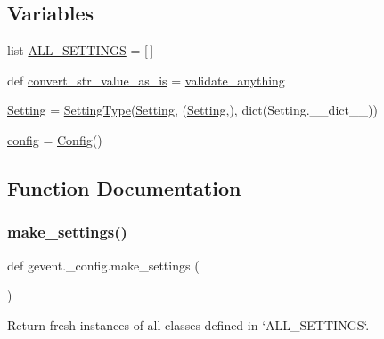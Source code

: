 \subsection*{Variables}
\begin{DoxyCompactItemize}
\item 
list \hyperlink{namespacegevent_1_1__config_a2234af414a8e29e19e450934eb35c6d0}{A\+L\+L\+\_\+\+S\+E\+T\+T\+I\+N\+GS} = \mbox{[}$\,$\mbox{]}
\item 
def \hyperlink{namespacegevent_1_1__config_a6a13721038d351f2beb717d878a45083}{convert\+\_\+str\+\_\+value\+\_\+as\+\_\+is} = \hyperlink{namespacegevent_1_1__config_a6588800a66294e87809274c9ed90bb21}{validate\+\_\+anything}
\item 
\hyperlink{namespacegevent_1_1__config_a8e4912eac38e2ae242f267b4111390fc}{Setting} = \hyperlink{classgevent_1_1__config_1_1_setting_type}{Setting\+Type}(\textquotesingle{}\hyperlink{classgevent_1_1__config_1_1_setting}{Setting}\textquotesingle{}, (\hyperlink{classgevent_1_1__config_1_1_setting}{Setting},), dict(Setting.\+\_\+\+\_\+dict\+\_\+\+\_\+))
\item 
\hyperlink{namespacegevent_1_1__config_a8c4472a27c205b88b76f8e4314a207c8}{config} = \hyperlink{classgevent_1_1__config_1_1_config}{Config}()
\end{DoxyCompactItemize}


\subsection{Function Documentation}
\mbox{\label{namespacegevent_1_1__config_a11c303bdbf900089c0633d237a63d211}} 
\subsubsection{\texorpdfstring{make\+\_\+settings()}{make\_settings()}}
{\footnotesize\ttfamily def gevent.\+\_\+config.\+make\+\_\+settings (\begin{DoxyParamCaption}{ }\end{DoxyParamCaption})}

\begin{DoxyVerb}Return fresh instances of all classes defined in `ALL_SETTINGS`.
\end{DoxyVerb}
 \mbox{\label{namespacegevent_1_1__config_a6588800a66294e87809274c9ed90bb21}} 
